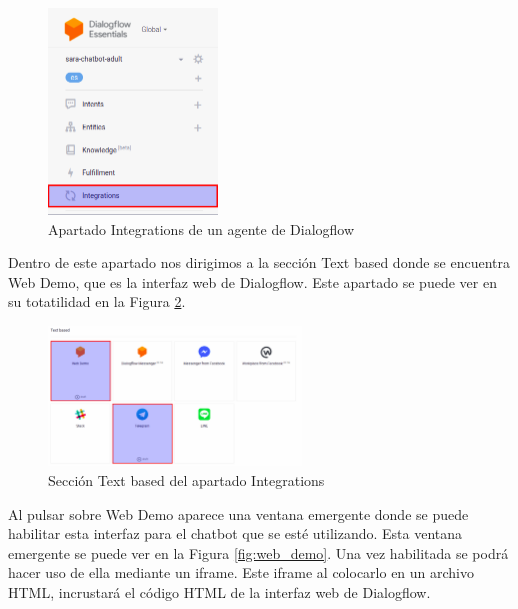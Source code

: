 \begin{figure}[h]
\centering
\includegraphics[width=0.4\textwidth]{imagenes/07_Implementacion/integrations_dialogflow.png}
\caption{Apartado Integrations de un agente de Dialogflow}
\label{fig:integrations_dialogflow}
\end{figure}

Dentro de este apartado nos dirigimos a la sección Text based donde se encuentra Web Demo, que es la interfaz web de Dialogflow. Este apartado se puede ver en su totatilidad en la Figura \ref{fig:text_based}.

\begin{figure}[h]
\centering
\includegraphics[width=0.6\textwidth]{imagenes/07_Implementacion/text_based.png}
\caption{Sección Text based del apartado Integrations}
\label{fig:text_based}
\end{figure}

Al pulsar sobre Web Demo aparece una ventana emergente donde se puede habilitar esta interfaz para el chatbot que se esté utilizando. Esta ventana emergente se puede ver en la Figura \ref{fig:web_demo}. Una vez habilitada se podrá hacer uso de ella mediante un iframe. Este iframe al colocarlo en un archivo HTML, incrustará el código HTML de la interfaz web de Dialogflow.

